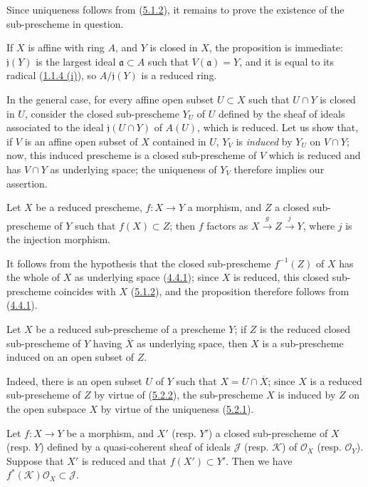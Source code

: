 Since uniqueness follows from (\hyperref[I.5.1.2]{5.1.2}), it remains to
prove the existence of the sub-prescheme in question.

If $X$ is affine with ring $A$, and $Y$ is closed in $X$, the proposition is
immediate: $\mathfrak{j}(Y)$ is the largest ideal
$\mathfrak{a}\subset A$ such that $V(\mathfrak{a})=Y$, and it is equal to its
radical (\hyperref[I.1.1.4]{1.1.4 (i)}), so
$A/\mathfrak{j}(Y)$ is a reduced ring.

In the general case, for every affine open subset $U\subset X$ such that
$U\cap Y$ is closed in $U$, consider the closed sub-prescheme $Y_U$ of $U$
defined by the sheaf of ideals associated to the ideal $\mathfrak{j}(U\cap Y)$
of $A(U)$, which is reduced. Let us show that, if $V$ is an affine open
subset of $X$ contained in $U$, $Y_V$ is \emph{induced} by $Y_U$ on
$V\cap Y$; now, this induced prescheme is a closed sub-prescheme of $V$ which
is reduced and has $V\cap Y$ as underlying space; the uniqueness of $Y_V$
therefore implies our assertion.

\begin{proposition}[5.2.2]
\label{I.5.2.2}
Let $X$ be a reduced prescheme, $f:X\to Y$ a morphism, and $Z$ a closed
sub-prescheme of $Y$ such that $f(X)\subset Z$; then $f$ factors
as $X\xrightarrow{g}Z\xrightarrow{j}Y$, where $j$ is the injection morphism.
\end{proposition}

It follows from the hypothesis that the closed sub-prescheme $f^{-1}(Z)$ of
$X$ has the whole of $X$ as underlying space
(\hyperref[I.4.4.1]{4.4.1}); since $X$ is reduced, this closed
sub-prescheme coincides with $X$ (\hyperref[I.5.1.2]{5.1.2}), and the
proposition therefore follows from (\hyperref[I.4.4.1]{4.4.1}).

\begin{corollary}[5.2.3]
\label{I.5.2.3}
Let $X$ be a reduced sub-prescheme of a prescheme $Y$; if $Z$ is the
reduced closed sub-prescheme of $Y$ having $\overline{X}$ as underlying
space, then $X$ is a sub-prescheme induced on an open subset of $Z$.
\end{corollary}

Indeed, there is an open subset $U$ of $Y$ such that
$X=U\cap\overline{X}$; since $X$ is a reduced sub-prescheme of $Z$ by
virtue of (\hyperref[I.5.2.2]{5.2.2}), the sub-prescheme $X$ is induced by
$Z$ on the open subspace $X$ by virtue of the uniqueness
(\hyperref[I.5.2.1]{5.2.1}).

\begin{corollary}[5.2.4]
\label{I.5.2.4}
Let $f:X\to Y$ be a morphism, and $X'$ (\textup{resp.} $Y'$) a closed sub-prescheme of
$X$ (\textup{resp.} $Y$) defined by a quasi-coherent sheaf of ideals $\mathscr{J}$
(\textup{resp.} $\mathscr{K}$) of $\mathscr{O}_X$ (\textup{resp.} $\mathscr{O}_Y$). Suppose
that $X'$ is reduced and that $f(X')\subset Y'$. Then we have
$f^*(\mathscr{K})\mathscr{O}_X\subset\mathscr{J}$.
\end{corollary}

